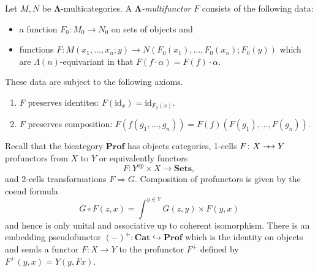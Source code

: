 \documentclass{amsbook} %
\newcommand{\mb}{\mathbf}
\newcommand{\id}{\textrm{id}}
\def\srarrow{\relbar\joinrel\mapstochar\joinrel\rightarrow}
\numberwithin{section}{chapter}
\begin{document}
\begin{Defi}
Let $M, N$ be $\mb{\Lambda}$-multicategories.  A \emph{$\mb{\Lambda}$-multifunctor} $F$ consists of the following data:
\begin{itemize}
\item a function $F_{0} \colon M_{0} \rightarrow N_{0}$ on sets of objects and
\item functions $F \colon M(x_1, \ldots, x_n; y) \rightarrow N(F_{0}(x_1), \ldots, F_{0}(x_n); F_{0}(y))$ which are $\Lambda(n)$-equivariant in that $F(f \cdot \alpha) = F(f) \cdot \alpha$.
\end{itemize}
These data are subject to the following axioms.
\begin{enumerate}
\item $F$ preserves identites: $F(\id_x) = \id_{F_{0}(x)}$.
\item $F$ preserves composition: $F\left( f(g_1, \ldots, g_n) \right) = F(f) \left( F(g_1), \ldots, F(g_n) \right).$
\end{enumerate}
\end{Defi}



Recall that the bicategory $\mb{Prof}$ has objects categories, 1-cells $F \colon X \srarrow Y$ profunctors from $X$ to $Y$ or equivalently functors
  \[
    F \colon Y^{\textrm{op}} \times X \rightarrow \mb{Sets},
  \]
and 2-cells transformations $F \Rightarrow G$.  Composition of profunctors is given by the coend formula
  \[
    G \circ F (z,x) = \int^{y \in Y} G(z,y) \times F(y,x)
  \]
and hence is only unital and associative up to coherent isomorphism.  There is an embedding pseudofunctor $(-)^{+} \colon  \mb{Cat} \hookrightarrow \mb{Prof}$ which is the identity on objects and sends a functor $F \colon X \rightarrow Y$ to the profunctor $F^{+}$ defined by $F^{+}(y,x) = Y(y,Fx)$.
\end{document}
